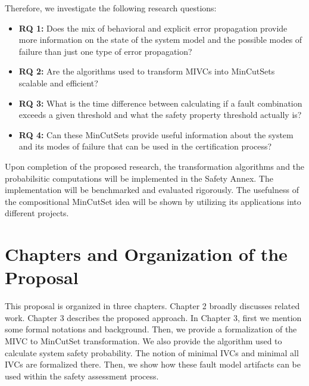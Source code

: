 Therefore, we investigate the following research questions:
\begin{itemize}
\item \textbf{RQ 1:} Does the mix of behavioral and explicit error propagation provide more information on the state of the system model and the possible modes of failure than just one type of error propagation?

\item \textbf{RQ 2:} Are the algorithms used to transform MIVCs into MinCutSets scalable and efficient?

\item \textbf{RQ 3:} What is the time difference between calculating if a fault combination exceeds a given threshold and what the safety property threshold actually is?

\item \textbf{RQ 4:} Can these MinCutSets provide useful information about the system and its modes of failure that can be used in the certification process?

\end{itemize}

Upon completion of the proposed research, the transformation algorithms and the probabilsitic computations will be implemented in the Safety Annex. The implementation will be benchmarked and evaluated rigorously. The usefulness of the compositional MinCutSet idea will be shown by utilizing its applications into different projects.

\section{Chapters and Organization of the Proposal}
This proposal is organized in three chapters. Chapter 2 broadly discusses related work. Chapter 3 describes the proposed approach. In Chapter 3, first we mention some formal notations and background. Then, we provide a formalization of the MIVC to MinCutSet transformation. We also provide the algorithm used to calculate system safety probability. The notion of minimal IVCs and minimal all IVCs are formalized there. Then, we show how these fault model artifacts can be used within the safety assessment process. 


